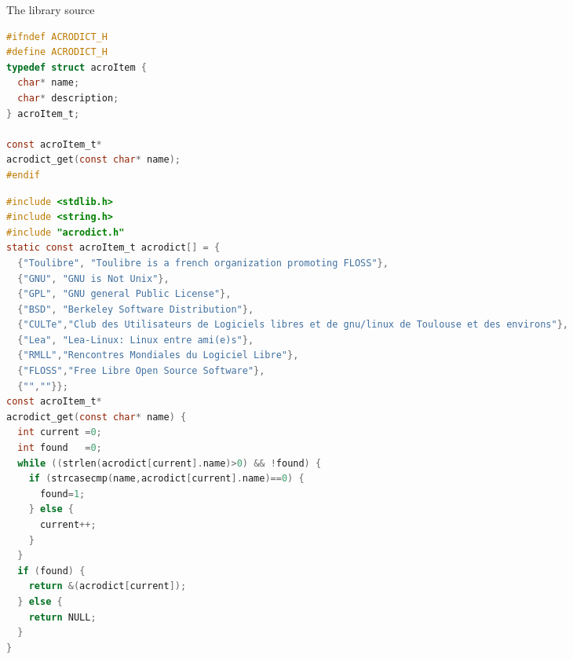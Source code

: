 \documentclass[compress,slidestop,table
              ]
               {beamer}
\begin{document}
\begin{frame}[fragile]
\setlength{\columnsep}{0.8cm}
\vspace*{-0.5cm}
\begin{center}
The library source
\end{center}
\begin{multicols}{2}
\begin{lstlisting}[basicstyle=\tiny,language=C,breaklines=true]
#ifndef ACRODICT_H
#define ACRODICT_H
typedef struct acroItem {
  char* name;
  char* description;
} acroItem_t;

const acroItem_t*
acrodict_get(const char* name);
#endif
\end{lstlisting}
\begin{lstlisting}[basicstyle=\tiny,language=C,breaklines=true]
#include <stdlib.h>
#include <string.h>
#include "acrodict.h"
static const acroItem_t acrodict[] = {
  {"Toulibre", "Toulibre is a french organization promoting FLOSS"},
  {"GNU", "GNU is Not Unix"},
  {"GPL", "GNU general Public License"},
  {"BSD", "Berkeley Software Distribution"},
  {"CULTe","Club des Utilisateurs de Logiciels libres et de gnu/linux de Toulouse et des environs"},
  {"Lea", "Lea-Linux: Linux entre ami(e)s"},
  {"RMLL","Rencontres Mondiales du Logiciel Libre"},
  {"FLOSS","Free Libre Open Source Software"},
  {"",""}};
const acroItem_t*
acrodict_get(const char* name) {
  int current =0;
  int found   =0;
  while ((strlen(acrodict[current].name)>0) && !found) {
    if (strcasecmp(name,acrodict[current].name)==0) {
      found=1;
    } else {
      current++;
    }
  }
  if (found) {
    return &(acrodict[current]);
  } else {
    return NULL;
  }
}
\end{lstlisting}
\end{multicols}
\end{frame}

\end{document}
